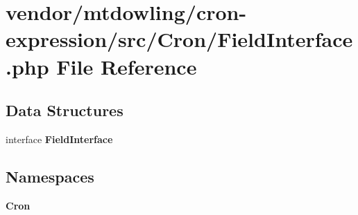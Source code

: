 \section{vendor/mtdowling/cron-\/expression/src/\+Cron/\+Field\+Interface.php File Reference}
\label{_field_interface_8php}
\subsection*{Data Structures}
\begin{DoxyCompactItemize}
\item 
interface {\bf Field\+Interface}
\end{DoxyCompactItemize}
\subsection*{Namespaces}
\begin{DoxyCompactItemize}
\item 
 {\bf Cron}
\end{DoxyCompactItemize}
